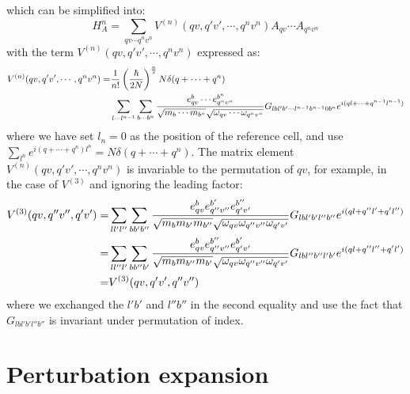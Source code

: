 \documentclass{article}
\begin{document}
which can be simplified into:
\begin{equation}
    H_{A}^{n} = \sum_{qv \cdots q^nv^n} V^{(n)}(qv,q'v',\cdots,q^nv^n)
    A_{qv} \cdots A_{q^nv^n}
\end{equation}
with the term $V^{(n)}(qv,q'v',\cdots,q^nv^n)$ expressed as:
\begin{align}
    V^{(n)}(qv,q'v',\cdots,q^nv^n) = &\frac{1}{n!} \left( \frac{\hbar}{2N} \right)^{\frac{n}{2}} N\delta(q + \cdots + q^n) \notag \\
     &\sum_{l\cdots l^{n-1}} \sum_{b\cdots b^n} 
    \frac{e_{qv}^b \cdots e_{q^nv^n}^{b^n}}{\sqrt{m_b \cdots m_{b^n}}\sqrt{\omega_{qv} \cdots \omega_{q^nv^n}}} G_{lbl'b'\cdots l^{n-1}b^{n-1}0b^n} e^{i(ql + \cdots + q^{n-1}l^{n-1})}
\end{align}
where we have set $l_n = 0$ as the position of the reference cell, and use $\sum_{l^n} e^{i(q+\cdots+q^n)l^n} = N \delta(q + \cdots + q^n) $. The matrix element 
$V^{(n)}(qv,q'v',\cdots,q^nv^n)$ is invariable to the permutation of $qv$, for example, in the case of $V^{(3)}$ and ignoring the leading factor:
\begin{align}
    V^{(3)}(qv,q''v'',q'v') = & \sum_{ll'l''} \sum_{bb'b''} 
    \frac{e_{qv}^b e_{q''v''}^{b'} e_{q'v'}^{b''} }{\sqrt{m_b m_{b'} m_{b''}} \sqrt{\omega_{qv}\omega_{q''v''}\omega_{q'v'}}} G_{lbl'b'l''b''} e^{i(ql + q''l' + q'l'')} \notag \\
    = &\sum_{ll''l'} \sum_{bb''b'} 
    \frac{e_{qv}^b e_{q''v''}^{b''} e_{q'v'}^{b'} }{\sqrt{m_b m_{b''} m_{b'}} \sqrt{\omega_{qv}\omega_{q''v''}\omega_{q'v'}}} G_{lbl''b''l'b'} e^{i(ql + q''l'' + q'l')} \notag \\
    = &V^{(3)}(qv,q'v',q''v'')
\end{align}
where we exchanged the $l'b'$ and $l''b''$ in the second equality and use the fact that $G_{lbl'b'l''b''}$ is invariant under permutation of index.

\section{Perturbation expansion}
\end{document}
